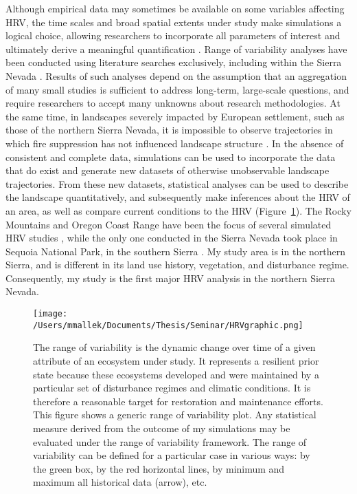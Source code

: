 Although empirical data may sometimes be available on some variables affecting HRV, the time scales and broad spatial extents under study make simulations a logical choice, allowing researchers to incorporate all parameters of interest and ultimately derive a meaningful quantification \citep{Swetnam1999,Mladenoff1999}. Range of variability analyses have been conducted using literature searches exclusively, including within the Sierra Nevada \citep[e.g.,][]{Safford2013}. Results of such analyses depend on the assumption that an aggregation of many small studies is sufficient to address long-term, large-scale questions, and require researchers to accept many unknowns about research methodologies. At the same time, in landscapes severely impacted by European settlement, such as those of the northern Sierra Nevada, it is impossible to observe trajectories in which fire suppression has not influenced landscape structure \citep{Keane2012}. In the absence of consistent and complete data, simulations can be used to incorporate the data that do exist and generate new datasets of otherwise unobservable landscape trajectories. From these new datasets, statistical analyses can be used to describe the landscape quantitatively, and subsequently make inferences about the HRV of an area, as well as compare current conditions to the HRV (Figure~\ref{fig:hrvplot}). The Rocky Mountains and Oregon Coast Range have been the focus of several simulated HRV studies \citep{Keane1996,Tinker2003,McGarigal2005,Nonaka2005,Blankenship2015}, while the only one conducted in the Sierra Nevada took place in Sequoia National Park, in the southern Sierra \citep{Miller1999}. My study area is in the northern Sierra, and is different in its land use history, vegetation, and disturbance regime. Consequently, my study is the first major HRV analysis in the northern Sierra Nevada. 

\begin{figure}[!htbp]
\centering
\texttt{[image: /Users/mmallek/Documents/Thesis/Seminar/HRVgraphic.png]}
\caption{The range of variability is the dynamic change over time of a given attribute of an ecosystem under study. It represents a resilient prior state because these ecosystems developed and were maintained by a particular set of disturbance regimes and climatic conditions. It is therefore a reasonable target for restoration and maintenance efforts. This figure shows a generic range of variability plot. Any statistical measure derived from the outcome of my simulations may be evaluated under the range of variability framework. The range of variability can be defined for a particular case in various ways: by the green box, by the red horizontal lines, by minimum and maximum all historical data (arrow), etc.
}
\label{fig:hrvplot}
\end{figure}

